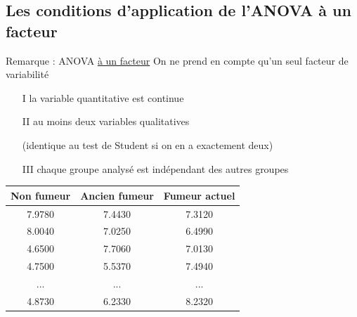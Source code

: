 \documentclass{beamer}
\begin{document}
\subsection{Les conditions d'application de l'ANOVA à un facteur}
\begin{frame}

\begin{alertblock}{Remarque : ANOVA \underline{à un facteur}}
On ne prend en compte qu'un seul facteur de variabilité
\end{alertblock}

\begin{itemize}
\frametitle{Les conditions d'application de l'ANOVA à un facteur (1/3)}
\item[I] la variable quantitative est continue
\item[II] au moins deux variables qualitatives
\item[] (identique au test de Student si on en a exactement deux)
\item[III] chaque groupe analysé est indépendant des autres groupes
\end{itemize} 

\begin{center}
\begin{tabular}{ |c|c|c| }
\hline
Non fumeur & Ancien fumeur & Fumeur actuel \\ 
\hline
7.9780 & 7.4430 & 7.3120 \\
\hline  
8.0040 & 7.0250 & 6.4990 \\
\hline  
4.6500 & 7.7060 & 7.0130 \\   
\hline  
4.7500 & 5.5370 & 7.4940 \\   
\hline
... & ... & ... \\    
\hline  
4.8730 & 6.2330 & 8.2320 \\  
\hline
\end{tabular}
\end{center}

\end{frame}
\end{document}
